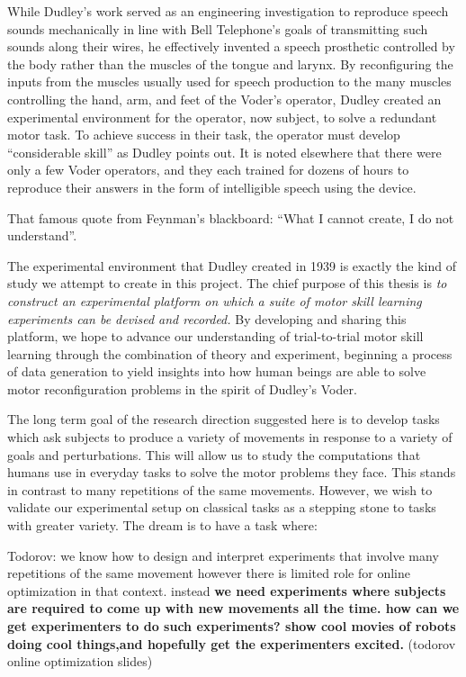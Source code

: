 \documentclass[../main.tex]{subfiles}
\begin{document}
\noindent While Dudley's work served as an engineering investigation to reproduce speech sounds mechanically in line with Bell Telephone's goals of transmitting such sounds along their wires, he effectively invented a speech prosthetic controlled by the body rather than the muscles of the tongue and larynx. By reconfiguring the inputs from the muscles usually used for speech production to the many muscles controlling the hand, arm, and feet of the Voder's operator, Dudley created an experimental environment for the operator, now subject, to solve a redundant motor task. To achieve success in their task, the operator must develop ``considerable skill'' as Dudley points out. It is noted elsewhere that there were only a few Voder operators, and they each trained for dozens of hours to reproduce their answers in the form of intelligible speech using the device.

That famous quote from Feynman's blackboard: ``What I cannot create, I do not understand''.

The experimental environment that Dudley created in 1939 is exactly the kind of study we attempt to create in this project. The chief purpose of this thesis is \textit{to construct an experimental platform on which a suite of motor skill learning experiments can be devised and recorded.} By developing and sharing this platform, we hope to advance our understanding of trial-to-trial motor skill learning through the combination of theory and experiment, beginning a process of data generation to yield insights into how human beings are able to solve motor reconfiguration problems in the spirit of Dudley's Voder.

The long term goal of the research direction suggested here is to develop tasks which ask subjects to produce a variety of movements in response to a variety of goals and perturbations. This will allow us to study the computations that humans use in everyday tasks to solve the motor problems they face. This stands in contrast to many repetitions of the same movements. However, we wish to validate our experimental setup on classical tasks as a stepping stone to tasks with greater variety. The dream is to have a task where: 

Todorov: we know how to design and interpret experiments that involve many repetitions of the same movement however there is limited role for online optimization in that context. instead \textbf{we need experiments where subjects are required to come up with new movements all the time. how can we get experimenters to do such experiments? show cool movies of robots doing cool things,and hopefully get the experimenters excited.} (todorov online optimization slides)
\end{document}
